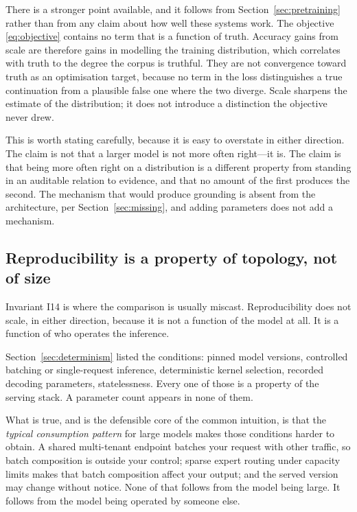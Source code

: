 \documentclass[11pt]{article}
\theoremstyle{plain}
\theoremstyle{definition}
\begin{document}
There is a stronger point available, and it follows from
Section~\ref{sec:pretraining} rather than from any claim about how well these systems
work. The objective \eqref{eq:objective} contains no term that is a function of
truth. Accuracy gains from scale are therefore gains in modelling the training
distribution, which correlates with truth to the degree the corpus is truthful. They
are not convergence toward truth as an optimisation target, because no term in the
loss distinguishes a true continuation from a plausible false one where the two
diverge. Scale sharpens the estimate of the distribution; it does not introduce a
distinction the objective never drew.

This is worth stating carefully, because it is easy to overstate in either
direction. The claim is not that a larger model is not more often right---it is. The
claim is that being more often right on a distribution is a different property from
standing in an auditable relation to evidence, and that no amount of the first
produces the second. The mechanism that would produce grounding is absent from the
architecture, per Section~\ref{sec:missing}, and adding parameters does not add a
mechanism.

\subsection{Reproducibility is a property of topology, not of size}

Invariant I14 is where the comparison is usually miscast. Reproducibility does not
scale, in either direction, because it is not a function of the model at all. It is a
function of who operates the inference.

Section~\ref{sec:determinism} listed the conditions: pinned model versions,
controlled batching or single-request inference, deterministic kernel selection,
recorded decoding parameters, statelessness. Every one of those is a property of the
serving stack. A parameter count appears in none of them.

What is true, and is the defensible core of the common intuition, is that the
\emph{typical consumption pattern} for large models makes those conditions harder to
obtain. A shared multi-tenant endpoint batches your request with other traffic, so
batch composition is outside your control; sparse expert routing under capacity
limits makes that batch composition affect your output; and the served version may
change without notice. None of that follows from the model being large. It follows
from the model being operated by someone else.
\end{document}
